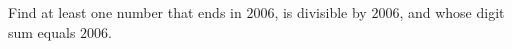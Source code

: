 Find at least one number that ends in $2006$, is divisible by $2006$, and whose digit sum equals $2006$.
